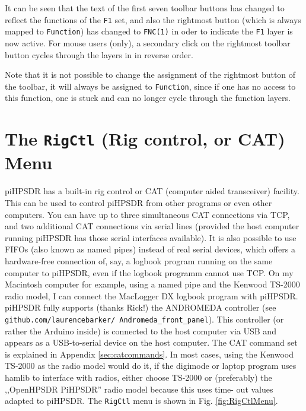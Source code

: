 \documentclass[12pt]{book}
\def\bltt#1{\texttt{\color{blue}#1}}
\begin{document}
It can be seen that the text of the first seven toolbar buttons has changed to reflect
the functions of the \texttt{F1} set, and also the rightmost button (which is always mapped
to \bltt{Function}) has changed to \texttt{FNC(1)} in oder to indicate the \texttt{F1}
layer is now active. For mouse users (only), a secondary click on the rightmost toolbar
button cycles through the layers in in reverse order.

Note that it is not possible to change the assignment of the  rightmost button of the toolbar,
it will always be assigned to \bltt{Function}, since if one has no access to this
function, one is stuck and can no longer cycle through the function layers.

\section{The \texttt{RigCtl} (Rig control, or CAT) Menu}

piHPSDR has a built-in rig control or CAT (computer aided transceiver) facility. This can be used to control
piHPSDR from
other programs or even other computers. You can have up to three simultaneous CAT connections via TCP, and
two additional CAT
connections via serial lines (provided the host computer running piHPSDR has those serial interfaces
available). It is
also possible to use FIFOs (also known as named pipes) instead of real serial devices, which offers a
hardware-free connection
of, say, a logbook program running on the same computer to piHPSDR, even if the logbook programm cannot use
TCP. On my Macintosh computer for example, using a named pipe and the Kenwood TS-2000 radio model,
I can connect the MacLogger DX logbook program with piHPSDR.
piHPSDR fully supports (thanks Rick!) the ANDROMEDA controller (see \texttt{github.com/laurencebarker/
Andromeda\_front\_panel}).
This controller (or rather the Arduino inside) is connected to the host computer via USB and appears as a
USB-to-serial
device on the host computer. The CAT command set is explained in Appendix \ref{sec:catcommands}. In most
cases, using
the Kenwood TS-2000 as the radio model would do it, if the digimode or laptop program uses hamlib to
interface with
radios, either choose TS-2000 or (preferably) the ,,OpenHPSDR PiHPSDR'' radio model because this uses time-
out values
adapted to piHPSDR. The \bltt{RigCtl} menu is shown in Fig. \ref{fig:RigCtlMenu}.
\end{document}
